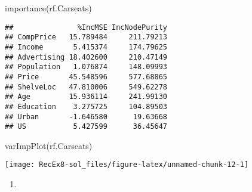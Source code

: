 \documentclass[
]{article}
\newenvironment{Shaded}{\begin{snugshade}}{\end{snugshade}}
\newcommand{\FunctionTok}[1]{\textcolor[rgb]{0.00,0.00,0.00}{#1}}
\newcommand{\NormalTok}[1]{#1}
\providecommand{\tightlist}{%
  \setlength{\itemsep}{0pt}\setlength{\parskip}{0pt}}
\begin{document}
\begin{Shaded}
\begin{Highlighting}[]
\FunctionTok{importance}\NormalTok{(rf.Carseats)}
\end{Highlighting}
\end{Shaded}

\begin{verbatim}
##               %IncMSE IncNodePurity
## CompPrice   15.789484     211.79213
## Income       5.415374     174.79625
## Advertising 18.402600     210.47149
## Population   1.076874     148.09993
## Price       45.548596     577.68865
## ShelveLoc   47.810006     549.62278
## Age         15.936114     241.99130
## Education    3.275725     104.89503
## Urban       -1.646580      19.63668
## US           5.427599      36.45647
\end{verbatim}

\begin{Shaded}
\begin{Highlighting}[]
\FunctionTok{varImpPlot}\NormalTok{(rf.Carseats)}
\end{Highlighting}
\end{Shaded}

\texttt{[image: RecEx8-sol\_files/figure-latex/unnamed-chunk-12-1]}

\begin{enumerate}
\def\labelenumi{\alph{enumi})}
\setcounter{enumi}{5}
\tightlist
\item
\end{enumerate}
\end{document}

